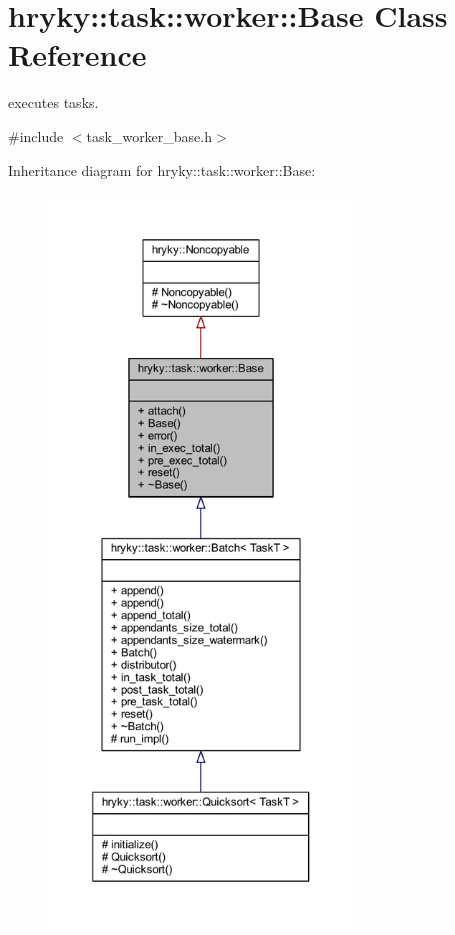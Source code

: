 \hypertarget{classhryky_1_1task_1_1worker_1_1_base}{\section{hryky\-:\-:task\-:\-:worker\-:\-:Base Class Reference}
\label{classhryky_1_1task_1_1worker_1_1_base}
}


executes tasks.  




{\ttfamily \#include $<$task\-\_\-worker\-\_\-base.\-h$>$}



Inheritance diagram for hryky\-:\-:task\-:\-:worker\-:\-:Base\-:
\nopagebreak
\begin{figure}[H]
\begin{center}
\leavevmode
\includegraphics[height=550pt]{classhryky_1_1task_1_1worker_1_1_base__inherit__graph}
\end{center}
\end{figure}
